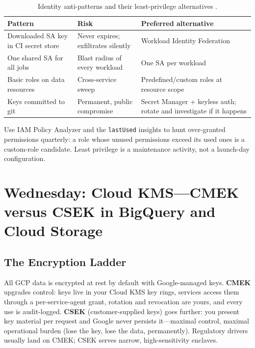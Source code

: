 \begin{table}[H]
\centering
\small
\begin{tabular}{@{}p{4.0cm}p{4.2cm}p{4.2cm}@{}} \\
\toprule
\textbf{Pattern} & \textbf{Risk} & \textbf{Preferred alternative} \\
\midrule
Downloaded SA key in CI secret store & Never expires; exfiltrates silently & Workload Identity Federation \\
One shared SA for all jobs & Blast radius of every workload & One SA per workload \\
Basic roles on data resources & Cross-service sweep & Predefined/custom roles at resource scope \\
Keys committed to git & Permanent, public compromise & Secret Manager + keyless auth; rotate and investigate if it happens \\
\bottomrule
\end{tabular}
\caption{Identity anti-patterns and their least-privilege alternatives \cite{googlecloudiamoverview}.}
\label{tab:ch21-identity-antipatterns}
\end{table}

\begin{tipbox}
Use IAM Policy Analyzer and the \texttt{lastUsed} insights to hunt over-granted permissions quarterly: a role whose unused permissions exceed its used ones is a custom-role candidate. Least privilege is a maintenance activity, not a launch-day configuration.
\end{tipbox}

\section{Wednesday: Cloud KMS---CMEK versus CSEK in BigQuery and Cloud Storage}

\subsection{The Encryption Ladder}
All GCP data is encrypted at rest by default with Google-managed keys. \textbf{CMEK} upgrades control: keys live in your Cloud KMS key rings, services access them through a per-service-agent grant, rotation and revocation are yours, and every use is audit-logged. \textbf{CSEK} (customer-supplied keys) goes further: you present key material per request and Google never persists it---maximal control, maximal operational burden (lose the key, lose the data, permanently). Regulatory drivers usually land on CMEK; CSEK serves narrow, high-sensitivity enclaves.

